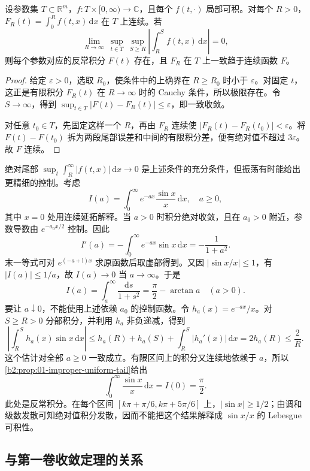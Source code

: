 \begin{proposition}\label{b2:prop:01-improper-uniform-tail}
设参数集 \(T\subset\mathbb R^m\)，\(f:T\times[0,\infty)\to\mathbb C\)，且每个 \(f(t,\cdot)\) 局部可积。对每个 \(R>0\)，\(F_R(t)=\int_0^R f(t,x)\,\mathrm{d}x\) 在 \(T\) 上连续。若
\[
\lim_{R\to\infty}\ \sup_{t\in T}\ \sup_{S\geq R}
\left|\int_R^S f(t,x)\,\mathrm{d}x\right|=0,
\]
则每个参数对应的反常积分 \(F(t)\) 存在，且 \(F_R\) 在 \(T\) 上一致趋于连续函数 \(F\)。
\end{proposition}
\begin{proof}
给定 \(\varepsilon>0\)，选取 \(R_0\)，使条件中的上确界在 \(R\geq R_0\) 时小于 \(\varepsilon\)。对固定 \(t\)，这正是有限积分 \(F_R(t)\) 在 \(R\to\infty\) 时的 Cauchy 条件，所以极限存在。令 \(S\to\infty\)，得到 \(\sup_{t\in T}|F(t)-F_R(t)|\leq\varepsilon\)，即一致收敛。

对任意 \(t_0\in T\)，先固定这样一个 \(R\)，再由 \(F_R\) 连续使 \(|F_R(t)-F_R(t_0)|<\varepsilon\)。将 \(F(t)-F(t_0)\) 拆为两段尾部误差和中间的有限积分差，便有绝对值不超过 \(3\varepsilon\)。故 \(F\) 连续。
\end{proof}

绝对尾部 \(\sup_t\int_R^\infty|f(t,x)|\,\mathrm{d}x\to0\) 是上述条件的充分条件，但振荡有时能给出更精细的控制。考虑
\[
I(a)=\int_0^\infty e^{-ax}\frac{\sin x}{x}\,\mathrm{d}x,
\quad a\geq0,
\]
其中 \(x=0\) 处用连续延拓解释。当 \(a>0\) 时积分绝对收敛，且在 \(a_0>0\) 附近，参数导数由 \(e^{-a_0x/2}\) 控制。因此
\[
I'(a)=-\int_0^\infty e^{-ax}\sin x\,\mathrm{d}x=-\frac1{1+a^2}.
\]
末一等式可对 \(e^{(-a+\mathrm{i})x}\) 求原函数后取虚部得到。又因 \(|\sin x/x|\leq1\)，有 \(|I(a)|\leq1/a\)，故 \(I(a)\to0\) 当 \(a\to\infty\)。于是
\[
I(a)=\int_a^\infty\frac{\mathrm{d}s}{1+s^2}
=\frac\pi2-\arctan a\quad(a>0).
\]
要让 \(a\downarrow0\)，不能使用上述依赖 \(a_0\) 的控制函数。令 \(h_a(x)=e^{-ax}/x\)。对 \(S\geq R>0\) 分部积分，并利用 \(h_a\) 非负递减，得到
\[
\left|\int_R^S h_a(x)\sin x\,\mathrm{d}x\right|
\leq h_a(R)+h_a(S)+\int_R^S|h_a'(x)|\,\mathrm{d}x
=2h_a(R)\leq\frac2R.
\]
这个估计对全部 \(a\geq0\) 一致成立。有限区间上的积分又连续地依赖于 \(a\)，所以\cref{b2:prop:01-improper-uniform-tail}给出
\[
\int_0^\infty\frac{\sin x}{x}\,\mathrm{d}x=I(0)=\frac\pi2.
\]
此处是反常积分。在每个区间 \([k\pi+\pi/6,k\pi+5\pi/6]\) 上，\(|\sin x|\geq1/2\)；由调和级数发散可知绝对值积分发散，因而不能把这个结果解释成 \(\sin x/x\) 的 Lebesgue 可积性。

\subsection{与第一卷收敛定理的关系}
\label{b2:subsec:010304}

